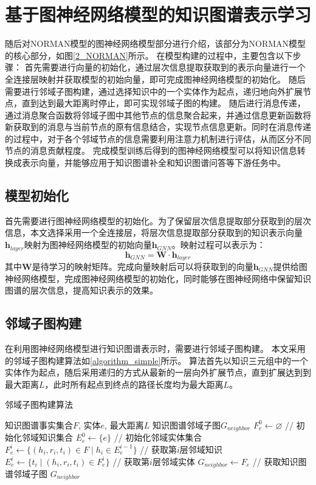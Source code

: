 \documentclass[algorithmlist, AutoFakeBold, AutoFakeSlant, figurelist, tablelist, nomlist, engineering, openany]{seuthesix} %
\begin{document}
\section{基于图神经网络模型的知识图谱表示学习}
随后对NORMAN模型的图神经网络模型部分进行介绍，该部分为NORMAN模型的核心部分，如图\ref{2_NORMAN}所示。
在模型构建的过程中，主要包含以下步骤：
首先需要进行向量的初始化，通过层次信息提取获取到的表示向量进行一个全连接层映射并获取模型的初始向量，即可完成图神经网络模型的初始化。
随后需要进行邻域子图构建，通过选择知识中的一个实体作为起点，递归地向外扩展节点，直到达到最大距离时停止，即可实现邻域子图的构建。
随后进行消息传递，通过消息聚合函数将邻域子图中其他节点的信息聚合起来，并通过信息更新函数将新获取到的消息与当前节点的原有信息结合，实现节点信息更新。同时在消息传递的过程中，对于各个邻域节点的信息需要利用注意力机制进行评估，从而区分不同节点的消息贡献程度。
完成模型训练后得到的图神经网络模型可以将知识信息转换成表示向量，并能够应用于知识图谱补全和知识图谱问答等下游任务中。

\subsection{模型初始化}
首先需要进行图神经网络模型的初始化。为了保留层次信息提取部分获取到的层次信息，本文选择采用一个全连接层，将层次信息提取部分获取到的知识表示向量$\bm{h}_{layer}$映射为图神经网络模型的初始向量$\bm{h}_{GNN}$。映射过程可以表示为：
\begin{equation}
  \bm{h}_{GNN} = \mathbf{W} \cdot \bm{h}_{layer}
\end{equation}
其中$\mathbf{W}$是待学习的映射矩阵。完成向量映射后可以将获取到的向量$\bm{h}_{GNN}$提供给图神经网络模型，完成图神经网络模型的初始化，同时能够在图神经网络中保留知识图谱的层次信息，提高知识表示的效果。

\subsection{邻域子图构建}
在利用图神经网络模型进行知识图谱表示时，需要进行邻域子图构建。
本文采用的邻域子图构建算法如\ref{algorithm_simple}所示。
算法首先以知识三元组中的一个实体作为起点，随后采用递归的方式从最新的一层向外扩展节点，直到扩展达到到最大距离$L$，此时所有起点到终点的路径长度均为最大距离$L$。
\begin{algorithm}[tb]
	\caption{邻域子图构建算法}
	\label{algorithm_simple}
	\begin{algorithmic}[1]
  \Require 知识图谱事实集合$F$, 实体$e$, 最大距离$L$
  \Ensure 知识图谱邻域子图$G_{neighbor}$
  \State $F_{e}^{0} \leftarrow \varnothing$ // 初始化邻域知识集合
  \State $E_{e}^{0} \leftarrow \{e\}$ // 初始化邻域实体集合
  \State $F_{e}^{i} \leftarrow \{(h_i, r_i, t_i) \in F \mid h_i \in E_{e}^{i-1}\}$ // 获取第$i$层邻域知识
  \State $E_{e}^{i} \leftarrow \{t_i \mid (h_i, r_i, t_i) \in F_{e}^{i}\}$ // 获取第$i$层邻域实体
  \EndFor
  \State $G_{neighbor} \leftarrow F_{e}$ // 获取知识图谱邻域子图
  \State \Return $G_{neighbor}$
	\end{algorithmic}
\end{algorithm} 
\end{document}
